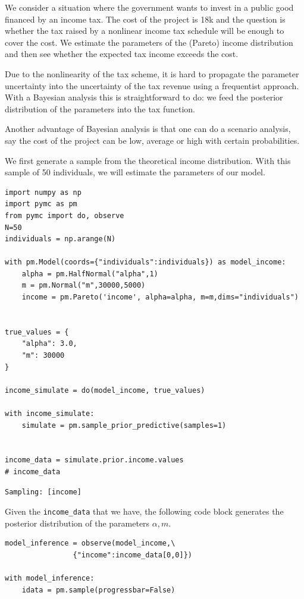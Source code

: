 \documentclass[11pt]{article}
\author{Jan Boone}
\date{\today}
\title{}
\begin{document}
We consider a situation where the government wants to invest in a public good financed by an income tax. The cost of the project is 18k and the question is whether the tax raised by a nonlinear income tax schedule will be enough to cover the cost. We estimate the parameters of the (Pareto) income distribution and then see whether the expected tax income exceeds the cost.

Due to the nonlinearity of the tax scheme, it is hard to propagate the parameter uncertainty into the uncertainty of the tax revenue using a frequentist approach. With a Bayesian analysis this is straightforward to do: we feed the posterior distribution of the parameters into the tax function.

Another advantage of Bayesian analysis is that one can do a scenario analysis, say the cost of the project can be low, average or high with certain probabilities.

We first generate a sample from the theoretical income distribution. With this sample of 50 individuals, we will estimate the parameters of our model.


\begin{verbatim}
import numpy as np
import pymc as pm
from pymc import do, observe
N=50
individuals = np.arange(N)

with pm.Model(coords={"individuals":individuals}) as model_income:
    alpha = pm.HalfNormal("alpha",1)
    m = pm.Normal("m",30000,5000)
    income = pm.Pareto('income', alpha=alpha, m=m,dims="individuals")


true_values = {
    "alpha": 3.0,
    "m": 30000
}

income_simulate = do(model_income, true_values)

with income_simulate:
    simulate = pm.sample_prior_predictive(samples=1)


income_data = simulate.prior.income.values
# income_data
\end{verbatim}

\label{}
\begin{verbatim}
Sampling: [income]
\end{verbatim}



Given the \texttt{income\_data}  that we have, the following code block generates the posterior distribution of the parameters \(\alpha,m\).

\begin{verbatim}
model_inference = observe(model_income,\
                {"income":income_data[0,0]})

with model_inference:
    idata = pm.sample(progressbar=False)

\end{verbatim}
\end{document}
